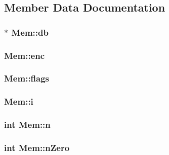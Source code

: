 \subsection{Member Data Documentation}
\hypertarget{struct_mem_a478da33d1e83a23931b372f9ddc706f2}{
\subsubsection[{db}]{$\ast$ Mem\-::db}}\label{struct_mem_a478da33d1e83a23931b372f9ddc706f2}
\hypertarget{struct_mem_af437c99e92b8e729b70f82fa94e96bff}{
\subsubsection[{enc}]{ Mem\-::enc}}\label{struct_mem_af437c99e92b8e729b70f82fa94e96bff}
\hypertarget{struct_mem_a209bf3317161d1e33af9fe8b512f4974}{
\subsubsection[{flags}]{ Mem\-::flags}}\label{struct_mem_a209bf3317161d1e33af9fe8b512f4974}
\hypertarget{struct_mem_a48360645ba68c4fbbe651a7b7cd5764a}{
\subsubsection[{i}]{ Mem\-::i}}\label{struct_mem_a48360645ba68c4fbbe651a7b7cd5764a}
\hypertarget{struct_mem_a5a613756e096c221ec68077c28424d84}{
\subsubsection[{n}]{\setlength{\rightskip}{0pt plus 5cm}int Mem\-::n}}\label{struct_mem_a5a613756e096c221ec68077c28424d84}
\hypertarget{struct_mem_adfee686fb1c3d644b10a498e134eabc2}{
\subsubsection[{n\-Zero}]{\setlength{\rightskip}{0pt plus 5cm}int Mem\-::n\-Zero}}\label{struct_mem_adfee686fb1c3d644b10a498e134eabc2}
